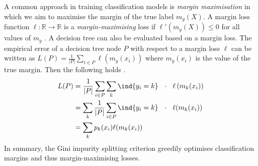 \documentclass[
	twoside=false, %
]{kaobook}
\begin{document}
A common approach in training classification models
is \textit{margin maximisation} \cite{schapire_BoostingFoundationsAlgorithms_2012}
in which we aim to maximise the margin of the true label $m_{y}(X)$. 
A margin loss function $\ell : \mathbb{R} \to \mathbb{R}$ is a \textit{margin-maximising} loss if $\ell'(m_{y}(X)) \leq 0$ for all values of $m_{y}$ \cite{leistner_SemiSupervisedRandomForests_2009}.
%
A decision tree can also be evaluated based on a margin loss.
The empirical error of a decision tree node $P$ with respect to a margin loss $\ell$ can be written as $L(P) = \frac{1}{|P|} \sum_{i \in P} \ell\left(m_{y}(x_{i})\right)$ where $m_{y}(x_{i})$ is the value of the true margin. Then the following holds \cite{leistner_SemiSupervisedRandomForests_2009}.
\begin{align*}
L(P) &= \frac{1}{|P|}\sum_{i \in P} \sum_{k} \ind{y_{i}=k} ~ ~ \cdot ~ ~  \ell   \left( m_k(x_i) \right)  \\
&= \sum_{k}  
\frac{1}{|P|} \sum_{i \in P} \ind{y_{i}=k}
~ ~ \cdot ~ ~ 
\ell(m_{k}(x_{i})) \\
&= \sum_k p_k(x_i) \ell(m_k(x_i))
\end{align*}
In summary, the Gini impurity splitting criterion greedily optimises classification margins and thus margin-maximising losses.
\end{document}
